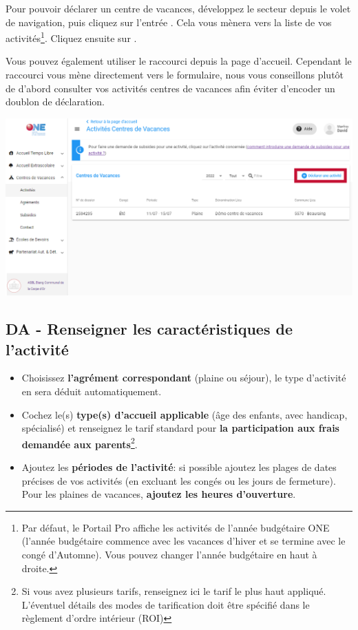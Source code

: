 Pour pouvoir déclarer un centre de vacances, développez le secteur  depuis le volet de navigation, puis cliquez sur l'entrée . Cela vous mènera vers la liste de vos activités\footnote{Par défaut, le Portail Pro affiche les activités de l'année budgétaire ONE (l'année budgétaire commence avec les vacances d'hiver et se termine avec le congé d'Automne). Vous pouvez changer l'année budgétaire en haut à droite.}. Cliquez ensuite sur . 

Vous pouvez également utiliser le raccourci depuis la page d'accueil. Cependant le raccourci vous mène directement vers le formulaire, nous vous conseillons plutôt de d'abord consulter vos activités centres de vacances afin éviter d'encoder un doublon de déclaration.  


\centerline{\includegraphics[width=14cm]{Images/cdv/liste_acti_cdv.png}}


\subsection{DA - Renseigner les caractéristiques de l'activité}
\begin{itemize}
    \item Choisissez \textbf{l'agrément correspondant} (plaine ou séjour), le type d'activité en sera déduit automatiquement.
    \item Cochez le(s) \textbf{type(s) d'accueil applicable} (âge des enfants, avec handicap, spécialisé) et renseignez le tarif standard pour  \textbf{la participation aux frais demandée aux parents}\footnote{Si vous avez plusieurs tarifs, renseignez ici le tarif le plus haut appliqué. L'éventuel détails des modes de tarification doit être spécifié dans le règlement d'ordre intérieur (ROI)}.
    \item Ajoutez les \textbf{périodes de l'activité}: si possible ajoutez les plages de dates précises de vos activités (en excluant les congés ou les jours de fermeture). Pour les plaines de vacances, \textbf{ajoutez les heures d'ouverture}.
\end{itemize} 

